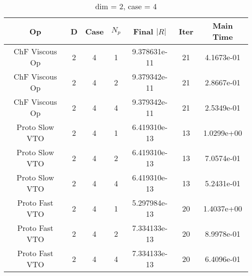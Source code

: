 \documentclass{article}
\begin{document}
\begin{small} 
  \begin{table} 
    \begin{center}
      \begin{tabular}{|c|c|c|c|c|c||c|} \hline
        Op & D & Case & $N_p$ & Final $|R|$  &  Iter & Main Time \\
        \hline
        ChF Viscous Op & 2 & 4 & 1& 9.378631e-11 & 21 & 4.1673e-01\\
        ChF Viscous Op & 2 & 4 & 2& 9.379342e-11 & 21 & 2.8667e-01\\
        ChF Viscous Op & 2 & 4 & 4& 9.379342e-11 & 21 & 2.5349e-01\\
        Proto Slow VTO & 2 & 4 & 1& 6.419310e-13 & 13 & 1.0299e+00\\
        Proto Slow VTO & 2 & 4 & 2& 6.419310e-13 & 13 & 7.0574e-01\\
        Proto Slow VTO & 2 & 4 & 4& 6.419310e-13 & 13 & 5.2431e-01\\
        Proto Fast VTO & 2 & 4 & 1& 5.297984e-13 & 20 & 1.4037e+00\\
        Proto Fast VTO & 2 & 4 & 2& 7.334133e-13 & 20 & 8.9978e-01\\
        Proto Fast VTO & 2 & 4 & 4& 7.334133e-13 & 20 & 6.4096e-01\\
        \hline
      \end{tabular} 
    \end{center}   
    \label{__dim_=_2__case_=_4} 
    \caption{dim = 2, case = 4} 
  \end{table} 
\end{small}
\end{document}
